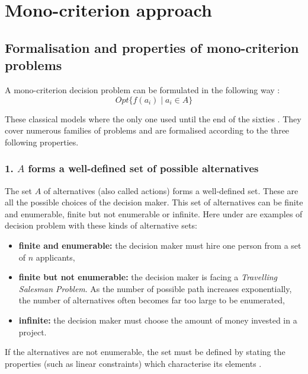 \section{Mono-criterion approach}
\subsection{Formalisation and properties of mono-criterion \\ problems}

A mono-criterion decision problem can be formulated in the following way \cite{Bertrand2002}:
\begin{equation}
    Opt \{ f(a_i) \mid a_i \in A\}
    \label{eq:monocriterion_decision_problem}
\end{equation}

These classical models where the only one used until the end of the sixties \cite{ROY1990324}. They cover numerous families of problems and are formalised according to the three following properties. 

\subsubsection {1. $A$ forms a well-defined set of possible alternatives \cite{ROY1990324}} \label{sec:set_of_alternatives}

The set $A$ of alternatives (also called actions) forms a well-defined set. These are all the possible choices of the decision maker. This set of alternatives can be finite and enumerable, finite but not enumerable or infinite. Here under are examples of decision problem with these kinds of alternative sets:
\begin{itemize}
    \item \textbf{finite and enumerable:} the decision maker must hire one person from a set of $n$ applicants,
\item \textbf{finite but not enumerable:} the decision maker is facing a \textit{Travelling Salesman Problem}. As the number of possible path increases exponentially, the number of alternatives often becomes far too large to be enumerated,
    \item \textbf{infinite:} the decision maker must choose the amount of money invested in a project.
\end{itemize}

If the alternatives are not enumerable, the set must be defined by stating the properties (such as linear constraints) which characterise its elements \cite{Vin92}.

